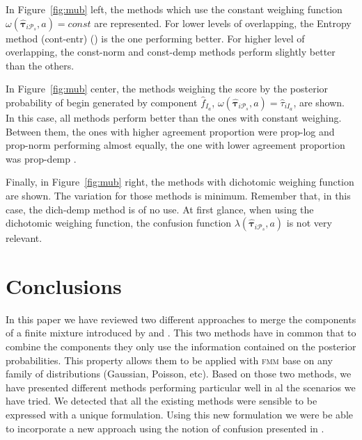 \documentclass[10pt, a4paper]{article}
\newcommand{\m}[1]{\boldsymbol{#1}}
\newcommand{\fmm}{\textsc{fmm}\xspace}
\begin{document}
\begin{spacing}{1.9}
In Figure~\ref{fig:mub} left, the methods which use the constant weighing function $\omega(\hat{\m \tau}_{i \mathcal{P}_s}, a) = const$ are represented. For lower levels of overlapping, the Entropy method (cont-entr) (\cite{baudry2010combining}) is the one performing better. For higher level of overlapping, the const-norm and const-demp methods perform slightly better than the others. %

In Figure~\ref{fig:mub} center, the methods weighing the score by the posterior probability of begin generated by component $\hat{f}_{I_a}$, $\omega(\hat{\m \tau}_{i \mathcal{P}_s}, a) =  \hat{\tau}_{iI_a}$, are shown. In this case, all methods perform better than the ones with constant weighing. Between them, the ones with higher agreement proportion were prop-log and prop-norm performing almost equally, the one with lower agreement proportion was prop-demp \citep{hennig2010methods}.

Finally, in Figure~\ref{fig:mub} right, the methods with dichotomic weighing function are shown. The variation for those methods is minimum. Remember that, in this case, the dich-demp method is of no use. At first glance, when using the dichotomic weighing function, the confusion function $\lambda(\hat{\m \tau}_{i \mathcal{P}_s}, a)$ is not very relevant.

\section{Conclusions}
\label{conclusions}

In this paper we have reviewed two different approaches to merge the components of a finite mixture introduced by \cite{hennig2010methods} and \cite{baudry2010combining}. This two methods have in common that to combine the components they only use the information contained on the posterior probabilities. This property allows them to be applied with \fmm base on any family of distributions (Gaussian, Poisson, etc). Based on those two methods, we have presented different methods performing particular well in al the scenarios we have tried. We detected that all the existing methods were sensible to be expressed with a unique formulation. Using this new formulation we were be able to incorporate a new approach using the notion of confusion presented in \cite{longford2014}. 


\end{spacing}
\end{document}
